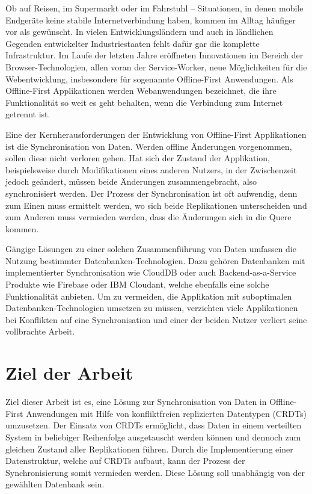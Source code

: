 \documentclass[a4paper, 12pt]{scrreprt}
\begin{document}
Ob auf Reisen, im Supermarkt oder im Fahrstuhl -- Situationen, in denen mobile Endgeräte keine stabile Internetverbindung haben, kommen im Alltag häufiger vor als gewünscht. In vielen Entwicklungsländern und auch in ländlichen Gegenden entwickelter Industriestaaten fehlt dafür gar die komplette Infrastruktur. Im Laufe der letzten Jahre eröffneten Innovationen im Bereich der Browser-Technologien, allen voran der Service-Worker, neue Möglichkeiten für die Webentwicklung, insbesondere für sogenannte Offline-First Anwendungen. Als Offline-First Applikationen werden Webanwendungen bezeichnet, die ihre Funktionalität so weit es geht behalten, wenn die Verbindung zum Internet getrennt ist.

Eine der Kernherausforderungen der Entwicklung von Offline-First Applikationen ist die Synchronisation von Daten. Werden offline Änderungen vorgenommen, sollen diese nicht verloren gehen. Hat sich der Zustand der Applikation, beispielsweise durch Modifikationen eines anderen Nutzers, in der Zwischenzeit jedoch geändert, müssen beide Änderungen zusammengebracht, also synchronisiert werden. Der Prozess der Synchronisation ist oft aufwendig, denn zum Einen muss ermittelt werden, wo sich beide Replikationen unterscheiden und zum Anderen muss vermieden werden, dass die Änderungen sich in die Quere kommen. 

Gängige Lösungen zu einer solchen Zusammenführung von Daten umfassen die Nutzung bestimmter Datenbanken-Technologien. Dazu gehören Datenbanken mit implementierter Synchronisation wie CloudDB oder auch Backend-as-a-Service Produkte wie Firebase oder IBM Cloudant, welche ebenfalls eine solche Funktionalität anbieten. Um zu vermeiden, die Applikation mit suboptimalen Datenbanken-Technologien umsetzen zu müssen, verzichten viele Applikationen bei Konflikten auf eine Synchronisation und einer der beiden Nutzer verliert seine vollbrachte Arbeit.

\section{Ziel der Arbeit} 

Ziel dieser Arbeit ist es, eine Lösung zur Synchronisation von Daten in Offline-First Anwendungen mit Hilfe von konfliktfreien replizierten Datentypen (\acp{CRDT}) umzusetzen. Der Einsatz von \acp{CRDT} ermöglicht, dass Daten in einem verteilten System in beliebiger Reihenfolge ausgetauscht werden können und dennoch zum gleichen Zustand aller Replikationen führen. Durch die Implementierung einer Datenstruktur, welche auf \acp{CRDT} aufbaut, kann der Prozess der Synchronisierung somit vermieden werden. Diese Lösung soll unabhängig von der gewählten Datenbank sein.
\end{document}
